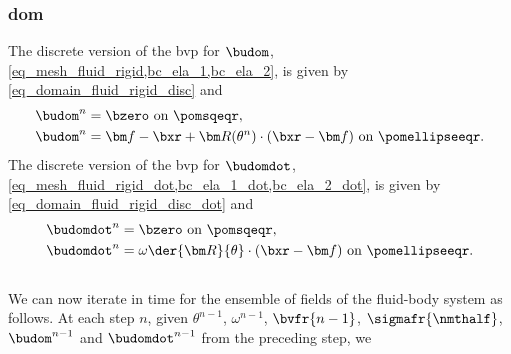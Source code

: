 \subsubsection{\Acl{dom}}\label{sec_splitting_scheme_fl_rig_dom}


The discrete version of  the \ac{bvp} for $\budom$, \cref{eq_mesh_fluid_rigid,bc_ela_1,bc_ela_2}, is given by \cref{eq_domain_fluid_rigid_disc} and
\begin{align}
        \label{bc_ela_1_disc}
        \budom^n & =\bzero \text{ on } \pomsqeqr,                                                                   \\
        \label{bc_ela_2_disc}
        \budom^n & = \bfocalpoint - \bxr + {\bm R}(\theta^n)\cdot (\bxr - \bfocalpoint) \text{ on } \pomellipseeqr.
\end{align}
The discrete version of the \ac{bvp} for $\budomdot$, \cref{eq_mesh_fluid_rigid_dot,bc_ela_1_dot,bc_ela_2_dot}, is given by \cref{eq_domain_fluid_rigid_disc_dot} and
\begin{align}
        \label{bc_ela_1_disc_dot}
        \budomdot  ^n & =\bzero \text{ on } \pomsqeqr,                                                         \\
        \label{bc_ela_2_disc_dot}
        \budomdot  ^n & =  \omega \der{{\bm R}}{\theta}\cdot (\bxr - \bfocalpoint) \text{ on } \pomellipseeqr.
\end{align}\\

We can now iterate in time for the ensemble of fields  of the fluid-body system as follows.
At each step $n$, given $\theta^{n-1}$, $\omega^{n-1}$, $\bvfr{n-1}$, $\sigmafr{\nmthalf}$, $\budom^{n-1}$ and $\budomdot^{n-1}$ from the preceding step, we
\begin{enumerate}
\end{enumerate}

